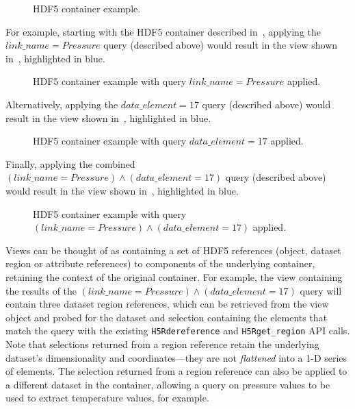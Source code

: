 \documentclass[letterpaper,hyper]{THG_RFC}
\begin{document}
\begin{figure}

\caption{HDF5 container example.}
\label{fig:hdf5_view1}
\end{figure}

For example, starting with the HDF5 container described in~,
applying the $link\_name = Pressure$ query (described above) would result
in the view shown in~, highlighted in blue.

\begin{figure}

\caption{HDF5 container example with query $link\_name = Pressure$ applied.}
\label{fig:hdf5_view2}
\end{figure}

Alternatively, applying the $data\_element = 17$ query (described above) would
result in the view shown in~, highlighted in blue.

\begin{figure}

\caption{HDF5 container example with query $data\_element = 17$ applied.}
\label{fig:hdf5_view3}
\end{figure}

Finally, applying the combined $(link\_name = Pressure)\land(data\_element = 17)$
query (described above) would result in the view shown in~,
highlighted in blue.

\begin{figure}

\caption{HDF5 container example with query $(link\_name = Pressure)\land(data\_element = 17)$ applied.}
\label{fig:hdf5_view4}
\end{figure}

Views can be thought of as containing a set of HDF5 references (object,
dataset region or attribute references) to components of the underlying
container, retaining the context of the original container. For example, the
view containing the results of the $(link\_name = Pressure)\land(data\_element = 17)$
query will contain three dataset region references, which
can be retrieved from the view object and probed for the dataset and selection
containing the elements that match the query with the existing \texttt{H5Rdereference}
and \texttt{H5Rget\_region} API calls. Note that selections returned from a region
reference retain the underlying dataset's dimensionality and coordinates---they
are not \textit{flattened} into a 1-D series of elements. The selection returned
from a region reference can also be applied to a different dataset in the container,
allowing a query on pressure values to be used to extract temperature values,
for example.
\end{document}
